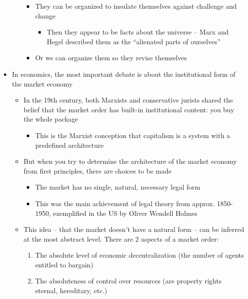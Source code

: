 \begin{itemize}
\begin{itemize}
    \begin{itemize}
    \tightlist
    \item
      They can be organized to insulate themselves against challenge and
      change

      \begin{itemize}
      \tightlist
      \item
        Then they appear to be facts about the universe -- Marx and
        Hegel described them as the ``alienated parts of ourselves''
      \end{itemize}
    \item
      Or we can organize them so they revise themselves
    \end{itemize}
  \end{itemize}
\item
  In economics, the most important debate is about the institutional
  form of the market economy

  \begin{itemize}
  \tightlist
  \item
    In the 19th century, both Marxists and conservative jurists shared
    the belief that the market order has built-in institutional content:
    you buy the whole package

    \begin{itemize}
    \tightlist
    \item
      This is the Marxist conception that capitalism is a system with a
      predefined architecture
    \end{itemize}
  \item
    But when you try to determine the architecture of the market economy
    from first principles, there are choices to be made

    \begin{itemize}
    \tightlist
    \item
      The market has no single, natural, necessary legal form
    \item
      This was the main achievement of legal theory from approx.
      1850-1950, exemplified in the US by Oliver Wendell Holmes
    \end{itemize}
  \item
    This idea -- that the market doesn't have a natural form -- can be
    inferred at the most abstract level. There are 2 aspects of a market
    order:

    \begin{enumerate}
    \def\labelenumi{\arabic{enumi}.}
    \tightlist
    \item
      The absolute level of economic decentralization (the number of
      agents entitled to bargain)
    \item
      The absoluteness of control over resources (are property rights
      eternal, hereditary, etc.)


\end{enumerate}
\end{itemize}
\end{itemize}

